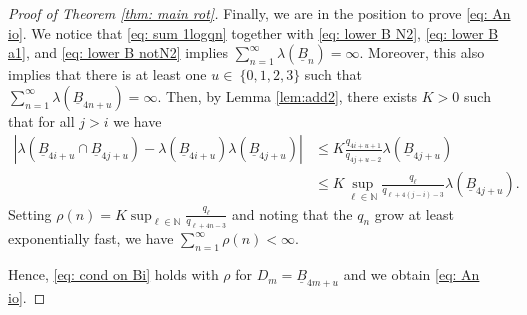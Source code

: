 \documentclass[11pt]{amsart}
\theoremstyle{definition}
\numberwithin{equation}{section}
\def\N{\mathbb{N}}
\begin{document}
\begin{proof}[Proof of Theorem \ref{thm: main rot}]
Finally, we are in the position to prove \eqref{eq: An io}.
We notice that \eqref{eq: sum 1logqn} together with \eqref{eq: lower B N2}, \eqref{eq: lower B a1}, and \eqref{eq: lower B notN2} implies 
$\sum_{n=1}^{\infty}\lambda(\underline{B}_n)=\infty$. 
 Moreover, this also implies that there is at least one $u\in {\ \{0,1,2,3\}}$ such that 
 $\sum_{n=1}^{\infty}\lambda(\underline{B}_{ 4n+u})=\infty$.
Then, by Lemma \ref{lem:add2}, there exists $K>0$ such that for all $j>i$ we have 
\begin{align*}
 |\lambda(\underline{B}_{ 4i+u}\cap \underline{B}_{4j+u})- \lambda(\underline{B}_{ 4i+u})\lambda(\underline{B}_{ 4j+u})|
 &\leq K\frac{q_{ 4i+u+1}}{q_{ 4j+u-2}}\lambda(\underline{B}_{ 4j+u})\\
 &\leq K\sup_{\ell\in \N}\frac{q_{\ell}}{q_{ \ell+4(j-i)-3}}\lambda(\underline{B}_{ 4j+u}).
\end{align*}
Setting $\rho(n)= K\sup_{\ell\in \N}\frac{q_{\ell}}{q_{ \ell+4n-3}}$ and noting that the $q_n$ grow at least exponentially fast, we have $\sum_{n=1}^{\infty}\rho(n)<\infty$.

Hence, \eqref{eq: cond on Bi} holds with $\rho$ for $D_m=\underline{B}_{ 4m+u}$ and we obtain \eqref{eq: An io}. 
\end{proof}
\end{document}
